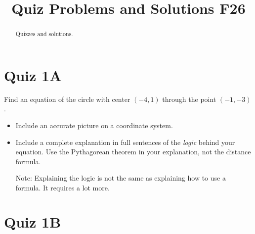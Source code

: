 \documentclass{ximera}
\title{Quiz Problems and Solutions F26}
\begin{document}
\begin{abstract}
Quizzes and solutions.
\end{abstract}
\maketitle

\section{Quiz 1A}

\begin{question} \label{Qmfdew9e}
Find an equation of the circle with center $(-4,1)$ through the point $(-1,-3)$. 
\begin{itemize}

\item Include an accurate picture on a coordinate system. 


\item Include a complete explanation in full sentences of the \emph{logic} behind your equation. Use the Pythagorean theorem in your explanation, not the distance formula.


Note: Explaining the logic is not the same as explaining how to use a formula. It requires a lot more.

\end{itemize}

\end{question}

\section{Quiz 1B}
\end{document}
